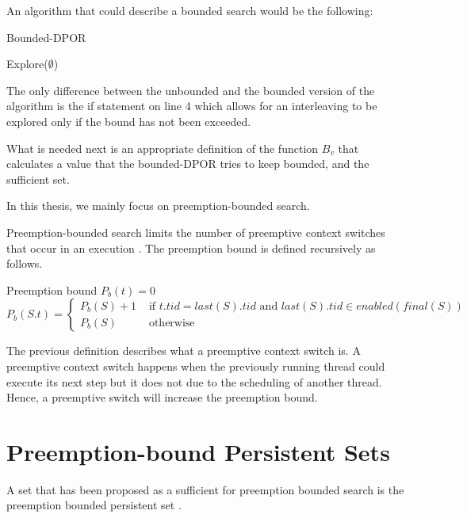 An algorithm that could describe a bounded search would be the following:

\begin{algorithm}[H]
    \caption{Bounded-DPOR}
    Explore($\emptyset$)\;
\end{algorithm}

\noindent The only difference between the unbounded and the bounded version of the algorithm is the if statement on line 4 which allows for an interleaving to be explored
only if the bound has not been exceeded.

What is needed next is an appropriate definition of the function $B_v$ that calculates a value that the bounded-DPOR tries to keep bounded, 
and the sufficient set. 

In this thesis, we mainly focus on preemption-bounded search. 

Preemption-bounded search limits the number of preemptive context switches that occur in an execution \cite{Musu07}. The 
preemption bound is defined recursively as follows.

\begin{definition}{Preemption bound}
$P_b(t) = 0$ \\
$P_b(S.t) = 
 \begin{cases} 
    P_b(S) + 1 & \text{ if } t.tid = last(S).tid \text{ and } last(S).tid \in enabled(final(S)) \\
    P_b(S) & \text{ otherwise }
 \end{cases}
$\\
\end{definition}

The previous definition describes what a preemptive context switch is. A preemptive context switch happens when the previously running thread could execute
its next step but it does not due to the scheduling of another thread. Hence, a preemptive switch will increase the preemption bound.

\section{Preemption-bound Persistent Sets}

A set that has been proposed as a sufficient for preemption bounded search is the preemption bounded persistent set \cite{BPOR}.

